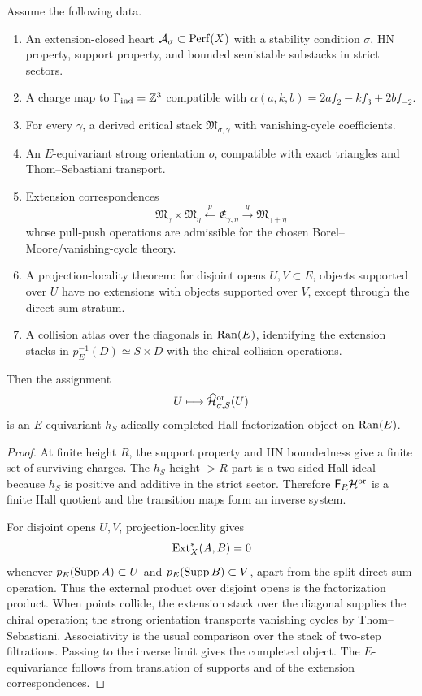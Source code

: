 \begin{theorem}
\label{thm:conditional-ranE-hall-construction}
Assume the following data.
\begin{enumerate}
\item An extension-closed heart \(\mathcal A_\sigma\subset\operatorname{Perf}(X)\) with
a stability condition \(\sigma\), HN property, support property, and
bounded semistable substacks in strict sectors.
\item A charge map to \(\Gamma_{\mathrm{ind}}=\mathbb Z^3\) compatible with
\(\alpha(a,k,b)=2af_2-kf_3+2bf_{-2}\).
\item For every \(\gamma\), a derived critical stack
\(\mathfrak M_{\sigma,\gamma}\) with vanishing-cycle coefficients.
\item An \(E\)-equivariant strong orientation \(o\), compatible with
exact triangles and Thom--Sebastiani transport.
\item Extension correspondences
\[
\mathfrak M_\gamma\times\mathfrak M_\eta
\xleftarrow{\ p\ }
\mathfrak E_{\gamma,\eta}
\xrightarrow{\ q\ }
\mathfrak M_{\gamma+\eta}
\]
whose pull-push operations are admissible for the chosen
Borel--Moore/vanishing-cycle theory.
\item A projection-locality theorem: for disjoint opens
\(U,V\subset E\), objects supported over \(U\) have no extensions with
objects supported over \(V\), except through the direct-sum stratum.
\item A collision atlas over the diagonals in \(\operatorname{Ran}(E)\), identifying
the extension stacks in \(p_E^{-1}(D)\simeq S\times D\) with the chiral
collision operations.
\end{enumerate}
Then the assignment
\[
U\longmapsto \widehat{\mathcal H}^{\mathrm{or}}_{\sigma,S}(U)
\]
is an \(E\)-equivariant \(h_S\)-adically completed Hall factorization
object on \(\operatorname{Ran}(E)\).
\end{theorem}

\begin{proof}
At finite height \(R\), the support property and HN boundedness give a
finite set of surviving charges.  The \(h_S\)-height \(>R\) part is a
two-sided Hall ideal because \(h_S\) is positive and additive in the
strict sector.  Therefore \(\mathsf F_R\mathcal H^{\mathrm{or}}\) is a finite
Hall quotient and the transition maps form an inverse system.

For disjoint opens \(U,V\), projection-locality gives
\[
\operatorname{Ext}_X^*(A,B)=0
\]
whenever \(p_E(\operatorname{Supp} A)\subset U\) and \(p_E(\operatorname{Supp} B)\subset V\), apart
from the split direct-sum operation.  Thus the external product over
disjoint opens is the factorization product.  When points collide, the
extension stack over the diagonal supplies the chiral operation; the
strong orientation transports vanishing cycles by Thom--Sebastiani.
Associativity is the usual comparison over the stack of two-step
filtrations.  Passing to the inverse limit gives the completed object.
The \(E\)-equivariance follows from translation of supports and of the
extension correspondences.
\end{proof}

